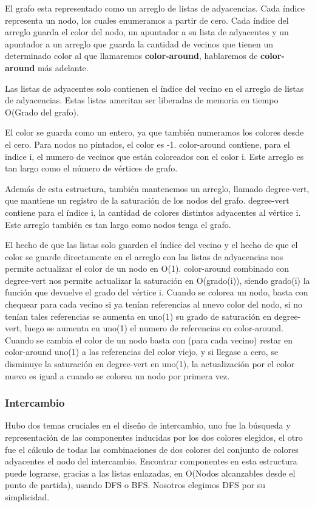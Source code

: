 \documentclass[a4paper,10pt]{article}
\begin{document}
El grafo esta representado como un arreglo de listas de
adyacencias. Cada índice representa un nodo, los cuales enumeramos a
partir de cero. Cada índice del arreglo guarda el color del nodo, un
apuntador a su lista de adyacentes y un apuntador a un arreglo que
guarda la cantidad de vecinos que tienen un determinado color al que
llamaremos \textbf{color-around}, hablaremos de \textbf{color-around}
más adelante.

Las listas de adyacentes solo contienen el índice del vecino en el
arreglo de listas de adyacencias. Estas listas ameritan ser liberadas de
memoria en tiempo O(Grado del grafo).

El color se guarda como un entero, ya que también numeramos los colores
desde el cero. Para nodos no pintados, el color es -1.
color-around contiene, para el indice i, el numero de vecinos que están
coloreados con el color i. Este arreglo es tan largo como el número de
vértices de grafo.

Además de esta estructura, también mantenemos un arreglo, llamado
degree-vert, que mantiene un registro de la saturación de los nodos del
grafo. degree-vert contiene para el índice i, la cantidad de colores
distintos adyacentes al vértice i. Este arreglo también es tan largo
como nodos tenga el grafo.

El hecho de que las listas solo guarden el índice del vecino y el hecho
de que el color se guarde directamente en el arreglo con las listas de
adyacencias nos permite actualizar el color de un nodo en O(1).
color-around combinado con degree-vert nos permite actualizar la
saturación en O(grado(i)), siendo grado(i) la función que devuelve el
grado del vértice i. Cuando se colorea un nodo, basta con chequear para
cada vecino si ya tenían referencias al nuevo color del nodo, si no
tenían tales referencias se aumenta en uno(1) su grado de saturación en
degree-vert, luego se aumenta en uno(1) el numero de referencias en
color-around. Cuando se cambia el color de un nodo basta con (para cada
vecino) restar en color-around uno(1) a las referencias del color viejo,
y si llegase a cero, se disminuye la saturación en degree-vert en
uno(1), la actualización por el color nuevo es igual a cuando se colorea
un nodo por primera vez.


\subsubsection{Intercambio}

Hubo dos temas cruciales en el diseño de intercambio, uno fue la
búsqueda y representación de las componentes inducidas por los dos
colores elegidos, el otro fue el cálculo de todas las combinaciones de
dos colores del conjunto de colores adyacentes el nodo del intercambio.
Encontrar componentes en esta estructura puede lograrse, gracias a las
listas enlazadas, en O(Nodos alcanzables desde el punto de partida),
usando DFS o BFS. Nosotros elegimos DFS por su simplicidad.
\end{document}
